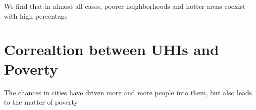 We find that in almost all cases, poorer neighborhoods and hotter areas coexist with high percentage


\section{Correaltion between UHIs and Poverty}

The chances in cities have driven more and more people into them, but also leads to the matter of poverty